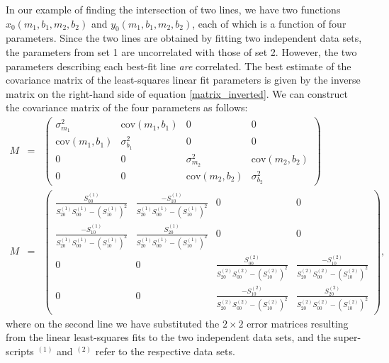 \documentclass{article}
\begin{document}
In our example of finding the intersection of two lines, we have two functions $x_0(m_1, b_1, m_2, b_2)$ and $y_0(m_1, b_1, m_2, b_2)$, each of which is a function of four parameters. Since the two lines are obtained by fitting two independent data sets, the parameters from set 1 are uncorrelated with those of set 2. However, the two parameters describing each best-fit line \emph{are} correlated. The best estimate of the covariance matrix of the least-squares linear fit parameters is given by the inverse matrix on the right-hand side of equation \eqref{matrix_inverted}. We can construct the covariance matrix of the four parameters as follows:
\begin{eqnarray}
  M &=& \left(\begin{array}{cccc} \sigma_{m_1}^2 & \mbox{cov}(m_1,b_1) & 0 & 0 \\ \mbox{cov}(m_1,b_1) & \sigma_{b_1}^2 & 0 & 0 \\ 0 & 0 & \sigma_{m_2}^2 & \mbox{cov}(m_2,b_2) \\ 0 & 0 & \mbox{cov}(m_2,b_2) & \sigma_{b_2}^2 \end{array}\right) \\
  M &=& \left(\begin{array}{cccc} \frac{S_{00}^{(1)}}{S_{20}^{(1)}S_{00}^{(1)} - (S_{10}^{(1)})^2} & \frac{-S_{10}^{(1)}}{S_{20}^{(1)}S_{00}^{(1)} - (S_{10}^{(1)})^2} & 0 & 0 \\ \frac{-S_{10}^{(1)}}{S_{20}^{(1)}S_{00}^{(1)} - (S_{10}^{(1)})^2} & \frac{S_{20}^{(1)}}{S_{20}^{(1)}S_{00}^{(1)} - (S_{10}^{(1)})^2} & 0 & 0 \\ 0 & 0 & \frac{S_{00}^{(2)}}{S_{20}^{(2)}S_{00}^{(2)} - (S_{10}^{(2)})^2} & \frac{-S_{10}^{(2)}}{S_{20}^{(2)}S_{00}^{(2)} - (S_{10}^{(2)})^2} \\ 0 & 0 & \frac{-S_{10}^{(2)}}{S_{20}^{(2)}S_{00}^{(2)} - (S_{10}^{(2)})^2} & \frac{S_{20}^{(2)}}{S_{20}^{(2)}S_{00}^{(2)} - (S_{10}^{(2)})^2} \end{array}\right),
\end{eqnarray} 
where on the second line we have substituted the $2 \times 2$ error matrices resulting from the linear least-squares fits to the two independent data sets, and the super-scripts $^{(1)}$ and $^{(2)}$ refer to the respective data sets. 
\end{document}
